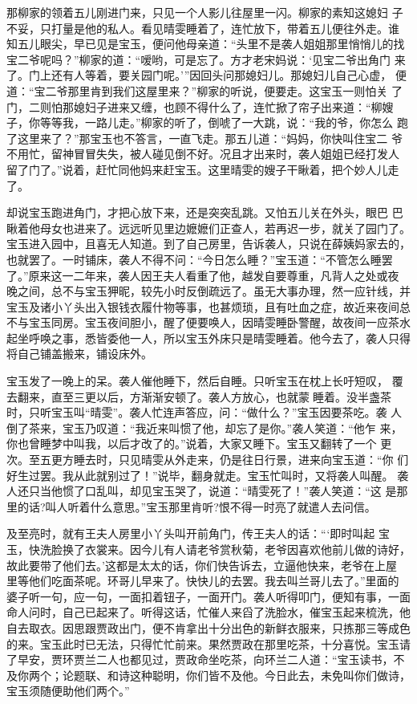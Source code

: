 那柳家的领着五儿刚进门来，只见一个人影儿往屋里一闪。柳家的素知这媳妇
子不妥，只打量是他的私人。看见晴雯睡着了，连忙放下，带着五儿便往外走。谁
知五儿眼尖，早已见是宝玉，便问他母亲道：“头里不是袭人姐姐那里悄悄儿的找
宝二爷呢吗？”柳家的道：“嗳哟，可是忘了。方才老宋妈说：‘见宝二爷出角门
来了。门上还有人等着，要关园门呢。’”因回头问那媳妇儿。那媳妇儿自己心虚，
便道：“宝二爷那里肯到我们这屋里来？”柳家的听说，便要走。这宝玉一则怕关
了门，二则怕那媳妇子进来又缠，也顾不得什么了，连忙掀了帘子出来道：“柳嫂
子，你等等我，一路儿走。”柳家的听了，倒唬了一大跳，说：“我的爷，你怎么
跑了这里来了？”那宝玉也不答言，一直飞走。那五儿道：“妈妈，你快叫住宝二
爷不用忙，留神冒冒失失，被人碰见倒不好。况且才出来时，袭人姐姐已经打发人
留了门了。”说着，赶忙同他妈来赶宝玉。这里晴雯的嫂子干瞅着，把个妙人儿走
了。

却说宝玉跑进角门，才把心放下来，还是突突乱跳。又怕五儿关在外头，眼巴
巴瞅着他母女也进来了。远远听见里边嬷嬷们正查人，若再迟一步，就关了园门了。
宝玉进入园中，且喜无人知道。到了自己房里，告诉袭人，只说在薛姨妈家去的，
也就罢了。一时铺床，袭人不得不问：“今日怎么睡？”宝玉道：“不管怎么睡罢
了。”原来这一二年来，袭人因王夫人看重了他，越发自要尊重，凡背人之处或夜
晚之间，总不与宝玉狎昵，较先小时反倒疏远了。虽无大事办理，然一应针线，并
宝玉及诸小丫头出入银钱衣履什物等事，也甚烦琐，且有吐血之症，故近来夜间总
不与宝玉同房。宝玉夜间胆小，醒了便要唤人，因晴雯睡卧警醒，故夜间一应茶水
起坐呼唤之事，悉皆委他一人，所以宝玉外床只是晴雯睡着。他今去了，袭人只得
将自己铺盖搬来，铺设床外。

宝玉发了一晚上的呆。袭人催他睡下，然后自睡。只听宝玉在枕上长吁短叹，
覆去翻来，直至三更以后，方渐渐安顿了。袭人方放心，也就蒙睡着。没半盏茶
时，只听宝玉叫“晴雯”。袭人忙连声答应，问：“做什么？”宝玉因要茶吃。袭
人倒了茶来，宝玉乃叹道：“我近来叫惯了他，却忘了是你。”袭人笑道：“他乍
来，你也曾睡梦中叫我，以后才改了的。”说着，大家又睡下。宝玉又翻转了一个
更次。至五更方睡去时，只见晴雯从外走来，仍是往日行景，进来向宝玉道：“你
们好生过罢。我从此就别过了！”说毕，翻身就走。宝玉忙叫时，又将袭人叫醒。
袭人还只当他惯了口乱叫，却见宝玉哭了，说道：“晴雯死了！”袭人笑道：“这
是那里的话?叫人听着什么意思。”宝玉那里肯听?恨不得一时亮了就遣人去问信。

及至亮时，就有王夫人房里小丫头叫开前角门，传王夫人的话：“‘即时叫起
宝玉，快洗脸换了衣裳来。因今儿有人请老爷赏秋菊，老爷因喜欢他前儿做的诗好，
故此要带了他们去。’这都是太太的话，你们快告诉去，立逼他快来，老爷在上屋
里等他们吃面茶呢。环哥儿早来了。快快儿的去罢。我去叫兰哥儿去了。”里面的
婆子听一句，应一句，一面扣着钮子，一面开门。袭人听得叩门，便知有事，一面
命人问时，自己已起来了。听得这话，忙催人来舀了洗脸水，催宝玉起来梳洗，他
自去取衣。因思跟贾政出门，便不肯拿出十分出色的新鲜衣服来，只拣那三等成色
的来。宝玉此时已无法，只得忙忙前来。果然贾政在那里吃茶，十分喜悦。宝玉请
了早安，贾环贾兰二人也都见过，贾政命坐吃茶，向环兰二人道：“宝玉读书，不
及你两个；论题联、和诗这种聪明，你们皆不及他。今日此去，未免叫你们做诗，
宝玉须随便助他们两个。”

